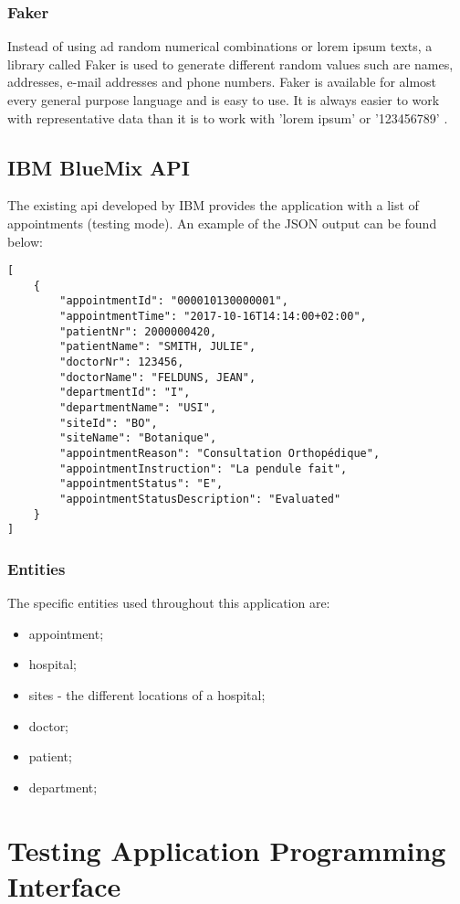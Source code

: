 \subsubsection{Faker}
Instead of using ad random numerical combinations or lorem ipsum texts, a library called Faker is used to generate different random values such are names, addresses, e-mail addresses and phone numbers. Faker is available for almost every general purpose language and is easy to use. It is always easier to work with representative data than it is to work with 'lorem ipsum' or '123456789' \cite{DanieleFaraglia2014}.
\subsection{IBM BlueMix API}
The existing \acrshort{api} developed by IBM provides the application with a list of appointments (testing mode). An example of the JSON output can be found below:

\begin{verbatim}
[
    {
        "appointmentId": "000010130000001",
        "appointmentTime": "2017-10-16T14:14:00+02:00",
        "patientNr": 2000000420,
        "patientName": "SMITH, JULIE",
        "doctorNr": 123456,
        "doctorName": "FELDUNS, JEAN",
        "departmentId": "I",
        "departmentName": "USI",
        "siteId": "BO",
        "siteName": "Botanique",
        "appointmentReason": "Consultation Orthopédique",
        "appointmentInstruction": "La pendule fait",
        "appointmentStatus": "E",
        "appointmentStatusDescription": "Evaluated"
    }
]
\end{verbatim}			
\subsubsection{Entities}
The specific entities used throughout this application are:
\begin{itemize}
\item appointment;
\item hospital;
\item sites - the different locations of a hospital;
\item doctor;
\item patient;
\item department;
\end{itemize}
\section{Testing Application Programming Interface}
